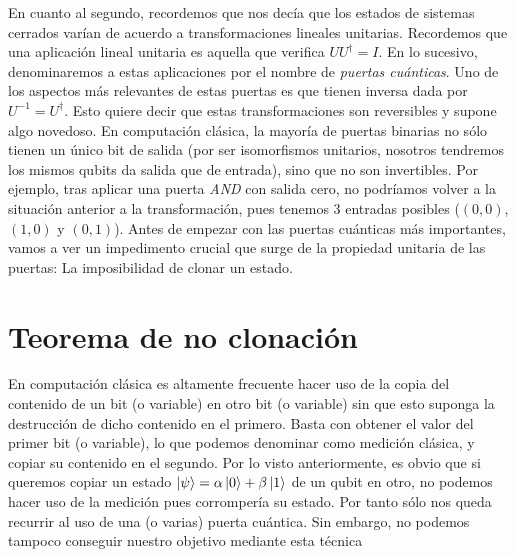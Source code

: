 En cuanto al segundo, recordemos que nos decía que los estados de sistemas cerrados varían de acuerdo a transformaciones lineales unitarias. Recordemos que una aplicación lineal unitaria es aquella que verifica $UU^\dag=I$. En lo sucesivo, denominaremos a estas aplicaciones por el nombre de \textit{puertas cuánticas}. Uno de los aspectos más relevantes de estas puertas es que tienen inversa dada por $U^{-1}=U^\dag$. Esto quiere decir que estas transformaciones son reversibles y supone algo novedoso. En computación clásica, la mayoría de puertas binarias no sólo tienen un único bit de salida (por ser isomorfismos unitarios, nosotros tendremos los mismos qubits da salida que de entrada), sino que no son invertibles. Por ejemplo, tras aplicar una puerta \textit{AND} con salida cero, no podríamos volver a la situación  anterior a la transformación, pues tenemos 3 entradas posibles ($(0,0)$, $(1,0)$ y $(0,1)$). Antes de empezar con las puertas cuánticas más importantes, vamos a ver un impedimento crucial que surge de la propiedad unitaria de las puertas: La imposibilidad de clonar un estado.

\section{Teorema de no clonación}
En computación clásica es altamente frecuente hacer uso de la copia del contenido de un bit (o variable) en otro bit (o variable) sin que esto suponga la destrucción de dicho contenido en el primero. Basta con obtener el valor del primer bit (o variable), lo que podemos denominar como medición clásica, y copiar su contenido en el segundo. Por lo visto anteriormente, es obvio que si queremos copiar un estado $\left|\psi\right\rangle=\alpha\left|0\right\rangle+\beta\left|1\right\rangle$ de un qubit en otro, no podemos hacer uso de la medición pues corrompería su estado. Por tanto sólo nos queda recurrir al uso de una (o varias) puerta cuántica. Sin embargo, no podemos tampoco conseguir nuestro objetivo mediante esta técnica

